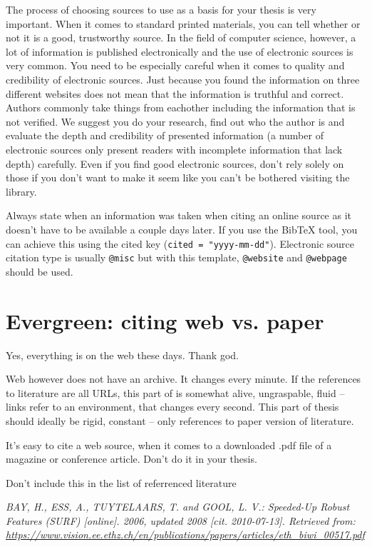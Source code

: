 The process of choosing sources to use as a basis for your thesis is very important. When it comes to standard printed materials, you can tell whether or not it is a good, trustworthy source. In the field of computer science, however, a lot of information is published electronically and the use of electronic sources is very common. You need to be especially careful when it comes to quality and credibility of electronic sources. Just because you found the information on three different websites does not mean that the information is truthful and correct. Authors commonly take things from eachother including the information that is not verified. We suggest you do your research, find out who the author is and evaluate the depth and credibility of presented information (a number of electronic sources only present readers with incomplete information that lack depth) carefully. Even if you find good electronic sources, don't rely solely on those if you don't want to make it seem like you can't be bothered visiting the library.

Always state when an information was taken when citing an online source as it doesn't have to be available a couple days later. If you use the BibTeX tool, you can achieve this using the cited key (\verb|cited = "yyyy-mm-dd"|). Electronic source citation type is usually \verb|@misc| but with this template, \verb|@website| and \verb|@webpage| should be used.

\section{Evergreen: citing web vs. paper}

Yes, everything is on the web these days. Thank god.

Web however does not have an archive. It changes every minute. If the references to literature are all URLs, this part of is somewhat alive, ungraspable, fluid -- links refer to an environment, that changes every second. This part of thesis should ideally be rigid, constant -- only references to paper version of literature.

It's easy to cite a web source, when it comes to a downloaded .pdf file of a magazine or conference article. Don't do it in your thesis.
\bigskip

\noindent Don't include this in the list of referrenced literature

\noindent \it BAY, H., ESS, A., TUYTELAARS, T. and GOOL, L. V.: Speeded-Up Robust Features (SURF) [online]. 2006, updated 2008 [cit. 2010-07-13]. Retrieved from: \url{https://www.vision.ee.ethz.ch/en/publications/papers/articles/eth_biwi_00517.pdf}
\bigskip
\rm

